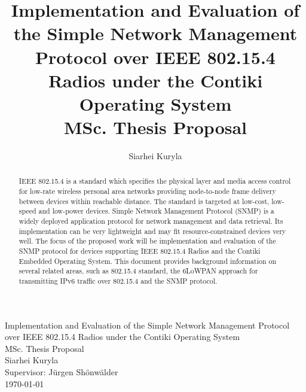 \documentclass[12pt, titlepage, a4paper]{report}
\title{Implementation and Evaluation of the Simple Network Management Protocol over IEEE 802.15.4 Radios under the Contiki Operating System\\ MSc. Thesis Proposal}
\author{Siarhei Kuryla}
\begin{document}
\begin{titlepage}

\begin{center}


\huge Implementation and Evaluation of the Simple Network Management Protocol over IEEE 802.15.4 Radios under the Contiki Operating System\\ [0.5cm]

\Large MSc. Thesis Proposal\\ [0.5cm]
Siarhei Kuryla\\ [0.5cm]

\large Supervisor: J\"urgen Sh\"onw\"alder\\[0.5cm]
{\large \today}


\end{center}
\end{titlepage}

\newpage
\thispagestyle{empty}

\newpage
\begin{abstract}
IEEE 802.15.4 is a standard which specifies the physical layer and media access control for low-rate wireless personal area networks providing node-to-node frame delivery between devices within reachable distance. The standard is targeted at low-cost, low-speed and low-power devices. Simple Network Management Protocol (SNMP) is a widely deployed application protocol for network management and data retrieval. Its implementation can be very lightweight and may fit resource-constrained devices very well. The focus of the proposed work will be implementation and evaluation of the SNMP protocol for devices supporting IEEE 802.15.4 Radios and the Contiki Embedded Operating System. This document provides background information on several related areas, such as 802.15.4 standard, the 6LoWPAN approach for transmitting IPv6 traffic over 802.15.4 and the SNMP protocol.

\end{abstract}

\newpage
\tableofcontents
\newpage

\end{document}
